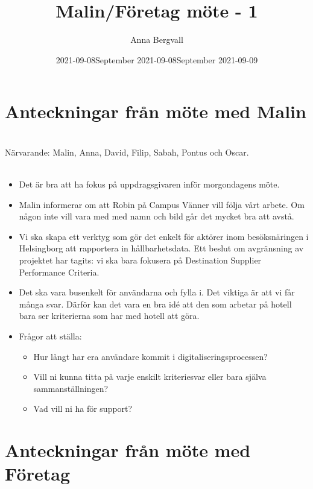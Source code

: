 \documentclass{article}
\title{Malin/Företag möte - 1}
\author{Anna Bergvall}
\date{2021-09-08}
\begin{document}
\maketitle

\section*{Anteckningar från möte med Malin }
\date{September 2021-09-08} \\
Närvarande: Malin, Anna, David, Filip, Sabah, Pontus och Oscar.\\
\\
\begin{itemize}

\item{Det är bra att ha fokus på uppdragsgivaren inför morgondagens möte. }
\item{Malin informerar om att Robin på Campus Vänner vill följa vårt arbete. Om någon inte vill vara med med namn och bild går det mycket bra att avstå.}
\item{Vi ska skapa ett verktyg som gör det enkelt för aktörer inom besöksnäringen i Helsingborg att rapportera in hållbarhetsdata. Ett beslut om avgränsning av projektet har tagits: vi ska bara fokusera på Destination Supplier Performance Criteria.}
\item Det ska vara busenkelt för användarna och fylla i. Det viktiga är att vi får många svar. Därför kan det vara en bra idé att den som arbetar på hotell bara ser kriterierna som har med hotell att göra.
\item{Frågor att ställa: \\ \begin{itemize}
    \item Hur långt har era användare kommit i digitaliseringsprocessen?
    \item Vill ni kunna titta på varje enskilt kriteriesvar eller bara själva sammanställningen?
    \item Vad vill ni ha för support?

\end{itemize}}

\end{itemize}




\section*{Anteckningar från möte med Företag }
\date{September 2021-09-09}
\end{document}
